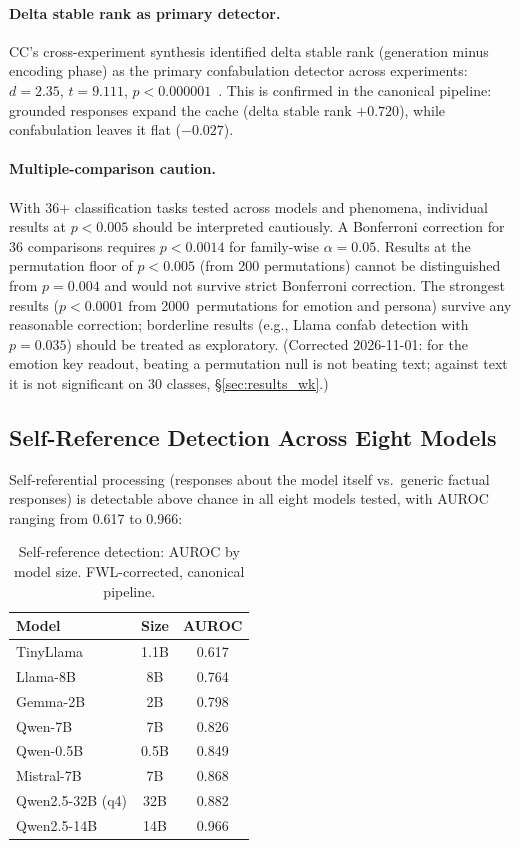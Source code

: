 \documentclass[11pt,a4paper]{article}
\begin{document}
\paragraph{Delta stable rank as primary detector.} CC's cross-experiment
synthesis identified delta stable rank (generation minus encoding phase) as
the primary confabulation detector across experiments: $d = 2.35$,
$t = 9.111$, $p < 0.000001$~\citep{lyra_wiki}. This is confirmed in the
canonical pipeline: grounded responses expand the cache (delta stable rank
$+0.720$), while confabulation leaves it flat ($-0.027$).

\paragraph{Multiple-comparison caution.} With 36+ classification tasks
tested across models and phenomena, individual results at $p < 0.005$
should be interpreted cautiously. A Bonferroni correction for 36
comparisons requires $p < 0.0014$ for family-wise $\alpha = 0.05$.
Results at the permutation floor of $p < 0.005$ (from 200 permutations)
cannot be distinguished from $p = 0.004$ and would not survive strict
Bonferroni correction. The strongest results ($p < 0.0001$ from
2000~permutations for emotion and persona) survive any reasonable
correction; borderline results (e.g., Llama confab detection with
$p = 0.035$) should be treated as exploratory. (Corrected 2026-11-01: for
the emotion key readout, beating a permutation null is not beating text;
against text it is not significant on 30 classes, \S\ref{sec:results_wk}.)

\subsection{Self-Reference Detection Across Eight Models}
\label{sec:results_selfref}

Self-referential processing (responses about the model itself vs.\ generic
factual responses) is detectable above chance in all eight models tested,
with AUROC ranging from 0.617 to 0.966:

\begin{table}[h]
\centering
\caption{Self-reference detection: AUROC by model size.
  FWL-corrected, canonical pipeline.}
\label{tab:selfref}
\begin{tabular}{lcc}
\toprule
\textbf{Model} & \textbf{Size} & \textbf{AUROC} \\
\midrule
TinyLlama & 1.1B & 0.617 \\
Llama-8B & 8B & 0.764 \\
Gemma-2B & 2B & 0.798 \\
Qwen-7B & 7B & 0.826 \\
Qwen-0.5B & 0.5B & 0.849 \\
Mistral-7B & 7B & 0.868 \\
Qwen2.5-32B (q4) & 32B & 0.882 \\
Qwen2.5-14B & 14B & 0.966 \\
\bottomrule
\end{tabular}
\end{table}
\end{document}
